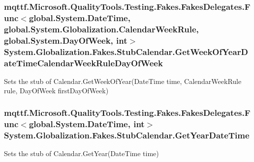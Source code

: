 \hypertarget{class_system_1_1_globalization_1_1_fakes_1_1_stub_calendar_a8c9034c6b0a71419dec2c4434683dff3}{
\subsubsection[{Get\-Week\-Of\-Year\-Date\-Time\-Calendar\-Week\-Rule\-Day\-Of\-Week}]{\setlength{\rightskip}{0pt plus 5cm}mqttf.\-Microsoft.\-Quality\-Tools.\-Testing.\-Fakes.\-Fakes\-Delegates.\-Func$<$global.\-System.\-Date\-Time, global.\-System.\-Globalization.\-Calendar\-Week\-Rule, global.\-System.\-Day\-Of\-Week, int$>$ System.\-Globalization.\-Fakes.\-Stub\-Calendar.\-Get\-Week\-Of\-Year\-Date\-Time\-Calendar\-Week\-Rule\-Day\-Of\-Week}}\label{class_system_1_1_globalization_1_1_fakes_1_1_stub_calendar_a8c9034c6b0a71419dec2c4434683dff3}


Sets the stub of Calendar.\-Get\-Week\-Of\-Year(\-Date\-Time time, Calendar\-Week\-Rule rule, Day\-Of\-Week first\-Day\-Of\-Week)

\hypertarget{class_system_1_1_globalization_1_1_fakes_1_1_stub_calendar_a4c33bdb46775428085b9587569c194f1}{
\subsubsection[{Get\-Year\-Date\-Time}]{\setlength{\rightskip}{0pt plus 5cm}mqttf.\-Microsoft.\-Quality\-Tools.\-Testing.\-Fakes.\-Fakes\-Delegates.\-Func$<$global.\-System.\-Date\-Time, int$>$ System.\-Globalization.\-Fakes.\-Stub\-Calendar.\-Get\-Year\-Date\-Time}}\label{class_system_1_1_globalization_1_1_fakes_1_1_stub_calendar_a4c33bdb46775428085b9587569c194f1}


Sets the stub of Calendar.\-Get\-Year(\-Date\-Time time)

